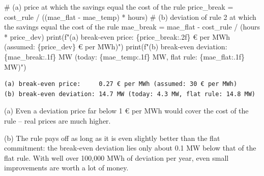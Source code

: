 \documentclass[
  letterpaper,
  DIV=11,
  numbers=noendperiod]{scrreprt}
\newenvironment{Shaded}{\begin{snugshade}}{\end{snugshade}}
\newcommand{\BuiltInTok}[1]{\textcolor[rgb]{0.00,0.23,0.31}{#1}}
\newcommand{\CommentTok}[1]{\textcolor[rgb]{0.37,0.37,0.37}{#1}}
\newcommand{\NormalTok}[1]{\textcolor[rgb]{0.00,0.23,0.31}{#1}}
\newcommand{\OperatorTok}[1]{\textcolor[rgb]{0.37,0.37,0.37}{#1}}
\newcommand{\SpecialCharTok}[1]{\textcolor[rgb]{0.37,0.37,0.37}{#1}}
\newcommand{\SpecialStringTok}[1]{\textcolor[rgb]{0.13,0.47,0.30}{#1}}
\begin{document}
\begin{tcolorbox}[enhanced jigsaw, left=2mm, title=\textcolor{quarto-callout-caution-color}{\faFire}\hspace{0.5em}{Solution to Exercise 6}, opacityback=0, breakable, rightrule=.15mm, arc=.35mm, toptitle=1mm, colbacktitle=quarto-callout-caution-color!10!white, opacitybacktitle=0.6, coltitle=black, colframe=quarto-callout-caution-color-frame, bottomrule=.15mm, leftrule=.75mm, bottomtitle=1mm, titlerule=0mm, toprule=.15mm, colback=white]

\begin{Shaded}
\begin{Highlighting}[]
\CommentTok{\# (a) price at which the savings equal the cost of the rule}
\NormalTok{price\_break }\OperatorTok{=}\NormalTok{ cost\_rule }\OperatorTok{/}\NormalTok{ ((mae\_flat }\OperatorTok{{-}}\NormalTok{ mae\_temp) }\OperatorTok{*}\NormalTok{ hours)}
\CommentTok{\# (b) deviation of rule 2 at which the savings equal the cost of the rule}
\NormalTok{mae\_break }\OperatorTok{=}\NormalTok{ mae\_flat }\OperatorTok{{-}}\NormalTok{ cost\_rule }\OperatorTok{/}\NormalTok{ (hours }\OperatorTok{*}\NormalTok{ price\_dev)}
\BuiltInTok{print}\NormalTok{(}\SpecialStringTok{f"(a) break{-}even price:     }\SpecialCharTok{\{}\NormalTok{price\_break}\SpecialCharTok{:.2f\}}\SpecialStringTok{ € per MWh (assumed: }\SpecialCharTok{\{}\NormalTok{price\_dev}\SpecialCharTok{\}}\SpecialStringTok{ € per MWh)"}\NormalTok{)}
\BuiltInTok{print}\NormalTok{(}\SpecialStringTok{f"(b) break{-}even deviation: }\SpecialCharTok{\{}\NormalTok{mae\_break}\SpecialCharTok{:.1f\}}\SpecialStringTok{ MW (today: }\SpecialCharTok{\{}\NormalTok{mae\_temp}\SpecialCharTok{:.1f\}}\SpecialStringTok{ MW, flat rule: }\SpecialCharTok{\{}\NormalTok{mae\_flat}\SpecialCharTok{:.1f\}}\SpecialStringTok{ MW)"}\NormalTok{)}
\end{Highlighting}
\end{Shaded}

\begin{verbatim}
(a) break-even price:     0.27 € per MWh (assumed: 30 € per MWh)
(b) break-even deviation: 14.7 MW (today: 4.3 MW, flat rule: 14.8 MW)
\end{verbatim}

(a) Even a deviation price far below 1 € per MWh would cover the cost of
the rule -- real prices are much higher.

(b) The rule pays off as long as it is even slightly better than the
flat commitment: the break-even deviation lies only about 0.1 MW below
that of the flat rule. With well over 100,000 MWh of deviation per year,
even small improvements are worth a lot of money.


\end{tcolorbox}
\end{document}
